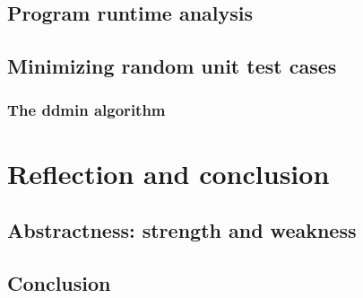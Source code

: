 \documentclass[a4paper,UKenglish]{lipics-v2018}
\begin{document}
\subsection{Program runtime analysis}
\subsection{Minimizing random unit test cases}
\subsubsection{The ddmin algorithm}

\section{Reflection and conclusion}
\subsection{Abstractness: strength and weakness}
\subsection{Conclusion}
\end{document}
